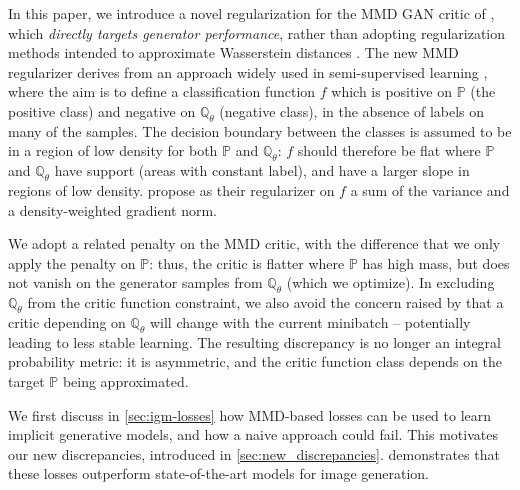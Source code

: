 \documentclass{article}
\newcommand{\PP}{\mathbb P}
\newcommand{\QQ}{\mathbb Q}
\let\citep\parencite
\begin{document}
In this paper, we introduce a novel regularization
for the MMD GAN critic of \citep{cramer-gan,mmd-gan,Binkowski:2018},
which {\em directly targets generator performance},
rather than
adopting regularization methods intended to approximate Wasserstein distances \cite{wgan,wgan-gp}.
The new MMD regularizer derives from an approach widely used in semi-supervised
learning \parencite[][Section 2]{Bousquet:2004}, where the aim is to
define a classification function $f$ which is positive on $\PP$
(the positive class) and negative on $\QQ_{\theta}$ (negative class),
in the absence of labels on many of the samples.
The decision boundary between the classes is assumed to be in a region
of low density for both $\PP$ and $\QQ_{\theta}$: $f$ should therefore
be flat where $\PP$ and $\QQ_{\theta}$ have support (areas with
constant label), and have a larger slope in regions of low density.
\Textcite{Bousquet:2004} propose as their regularizer on $f$ a sum of the
variance and a density-weighted gradient norm.

We adopt a related penalty on the MMD critic,
with the difference that we only apply the penalty on $\PP$:
thus, the critic is flatter where $\PP$ has high mass,
but does not vanish on the generator samples from $\QQ_{\theta}$ (which we optimize).
In excluding $\QQ_{\theta}$ from the critic function constraint,
we also avoid the concern raised by \citep{Miyato:2018}
that a critic depending on $\QQ_{\theta}$ will change with the current minibatch --
potentially leading to less stable learning.
The resulting discrepancy is no longer an integral probability metric:
it is asymmetric,
and the critic function class depends on the target $\PP$ being approximated.

We first discuss in \cref{sec:igm-losses} how MMD-based losses can be used to learn implicit generative models, and how a naive approach could fail.
This motivates our new discrepancies, introduced in \cref{sec:new_discrepancies}.
 demonstrates that these losses outperform state-of-the-art models for image generation.
\end{document}
